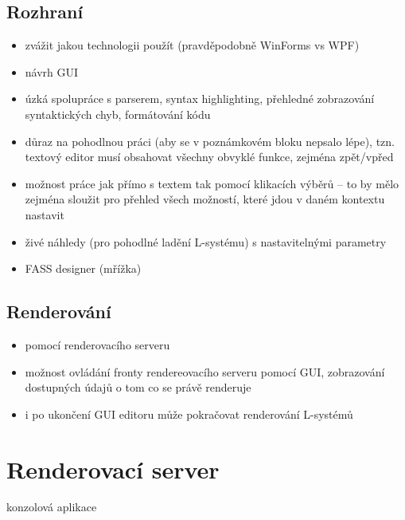 \documentclass[12pt, a4paper]{article}
\begin{document}
\subsection{Rozhraní}
\begin{itemize}
	\item zvážit jakou technologii použít (pravděpodobně WinForms vs WPF)
	
	\item návrh GUI
	
	\item úzká spolupráce s parserem, syntax highlighting, přehledné zobrazování syntaktických chyb, formátování kódu
	
	\item důraz na pohodlnou práci (aby se v poznámkovém bloku nepsalo lépe), tzn. textový editor musí obsahovat všechny obvyklé funkce, zejména zpět/vpřed
	
	\item možnost práce jak přímo s textem tak pomocí klikacích výběrů -- to by mělo zejména sloužit pro přehled všech možností, které jdou v daném kontextu nastavit
	
	\item živé náhledy (pro pohodlné ladění L-systému) s nastavitelnými parametry
	
	\item FASS designer (mřížka)
\end{itemize}

\subsection{Renderování}
\begin{itemize}
	\item pomocí renderovacího serveru
	
	\item možnost ovládání fronty rendereovacího serveru pomocí GUI, zobrazování dostupných údajů o tom co se právě renderuje
	
	\item i po ukončení GUI editoru může pokračovat renderování L-systémů
\end{itemize}


\section{Renderovací server}
konzolová aplikace
\end{document}

